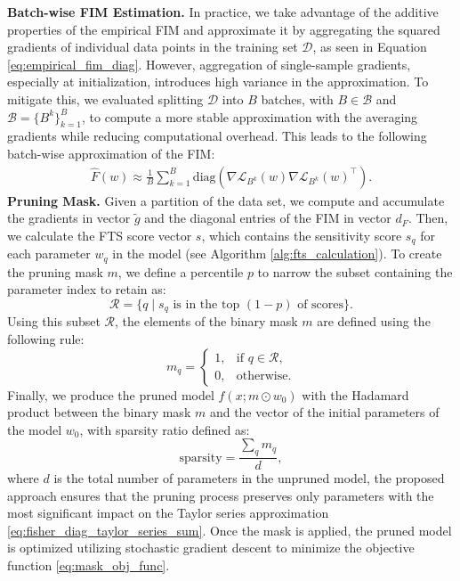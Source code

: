 \textbf{Batch-wise FIM Estimation.} In practice, we take advantage of the additive properties of the empirical FIM and approximate it by aggregating the squared gradients of individual data points in the training set $\mathcal{D}$, as seen in Equation \eqref{eq:empirical_fim_diag}. However, aggregation of single-sample gradients, especially at initialization, introduces high variance in the approximation. To mitigate this, we evaluated splitting $\mathcal{D}$ into $B$ batches, with $B \in \mathcal{B}$ and $\mathcal{B} = \{B^{k}\}_{k=1}^{B}$, to compute a more stable approximation with the averaging gradients while reducing computational overhead. This leads to the following batch-wise approximation of the FIM:
\begin{align}
    \hat{F}(w) \approx \frac{1}{B} \sum_{k=1}^{B} \text{diag} \left(
        \nabla \mathcal{L}_{B^k}(w) \nabla \mathcal{L}_{B^k}(w)^\top
    \right).
\end{align}
\textbf{Pruning Mask.} Given a partition of the data set, we compute and accumulate the gradients in vector $\tilde{g}$ and the diagonal entries of the FIM in vector $d_{F}$. Then, we calculate the FTS score vector $s$, which contains the sensitivity score $s_q$ for each parameter $w_q$ in the model (see Algorithm \ref{alg:fts_calculation}). To create the pruning mask $m$, we define a percentile $p$ to narrow the subset containing the parameter index to retain as:
\[
\mathcal{R} = \{ q \mid s_q \text{ is in the top } (1 - p) \text{ of scores} \}.
\]
Using this subset $\mathcal{R}$, the elements of the binary mask $m$ are defined using the following rule:
\[
m_q =
\begin{cases}
1, & \text{if } q \in \mathcal{R}, \\
0, & \text{otherwise}.
\end{cases}
\]
Finally, we produce the pruned model $f(x; m \odot w_0)$ with the Hadamard product between the binary mask $m$ and the vector of the initial parameters of the model $w_0$, with sparsity ratio defined as:
\[
\text{sparsity} = \frac{\sum_{q} m_q}{d},
\]
where $d$ is the total number of parameters in the unpruned model, the proposed approach ensures that the pruning process preserves only parameters with the most significant impact on the Taylor series approximation \eqref{eq:fisher_diag_taylor_series_sum}. Once the mask is applied, the pruned model is optimized utilizing stochastic gradient descent to minimize the objective function \eqref{eq:mask_obj_func}.
